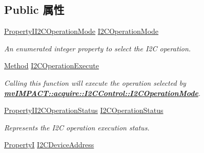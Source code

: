 \subsection*{Public 属性}
\begin{DoxyCompactItemize}
\item 
\hyperlink{group___device_specific_interface_ga605f7a21a4a20a008acbd59d6f18f3e9}{Property\+I\+I2\+C\+Operation\+Mode} \hyperlink{classmv_i_m_p_a_c_t_1_1acquire_1_1_i2_c_control_a748f6467d536445c1cfef03dbe74104c}{I2\+C\+Operation\+Mode}
\begin{DoxyCompactList}\small\item\em An enumerated integer property to select the I2\+C operation. \end{DoxyCompactList}\item 
\hypertarget{classmv_i_m_p_a_c_t_1_1acquire_1_1_i2_c_control_a8da9d7067602fe987ac12cbf3c007d84}{\hyperlink{classmv_i_m_p_a_c_t_1_1acquire_1_1_method}{Method} \hyperlink{classmv_i_m_p_a_c_t_1_1acquire_1_1_i2_c_control_a8da9d7067602fe987ac12cbf3c007d84}{I2\+C\+Operation\+Execute}}\label{classmv_i_m_p_a_c_t_1_1acquire_1_1_i2_c_control_a8da9d7067602fe987ac12cbf3c007d84}

\begin{DoxyCompactList}\small\item\em Calling this function will execute the operation selected by {\bfseries \hyperlink{classmv_i_m_p_a_c_t_1_1acquire_1_1_i2_c_control_a748f6467d536445c1cfef03dbe74104c}{mv\+I\+M\+P\+A\+C\+T\+::acquire\+::\+I2\+C\+Control\+::\+I2\+C\+Operation\+Mode}}. \end{DoxyCompactList}\item 
\hyperlink{group___device_specific_interface_ga4e0a176291dd65f15a0fddf3c1d552a1}{Property\+I\+I2\+C\+Operation\+Status} \hyperlink{classmv_i_m_p_a_c_t_1_1acquire_1_1_i2_c_control_a36782988f085b21b07f05b496af21b80}{I2\+C\+Operation\+Status}
\begin{DoxyCompactList}\small\item\em Represents the I2\+C operation execution status. \end{DoxyCompactList}\item 
\hypertarget{classmv_i_m_p_a_c_t_1_1acquire_1_1_i2_c_control_a1e0c719578f2e4a4acb7e952ac12e8d6}{\hyperlink{group___common_interface_ga12d5e434238ca242a1ba4c6c3ea45780}{Property\+I} \hyperlink{classmv_i_m_p_a_c_t_1_1acquire_1_1_i2_c_control_a1e0c719578f2e4a4acb7e952ac12e8d6}{I2\+C\+Device\+Address}}\label{classmv_i_m_p_a_c_t_1_1acquire_1_1_i2_c_control_a1e0c719578f2e4a4acb7e952ac12e8d6}


\end{DoxyCompactItemize}
